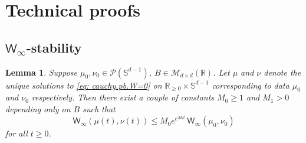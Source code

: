 \documentclass[a4paper,11pt]{article}
\theoremstyle{plain}
\newtheorem{lemma}[theorem]{Lemma}
\newcommand{\R}{\mathbb{R}}
\renewcommand{\S}{\mathbb{S}^{d-1}}
\newcommand{\bB}{\bm{\mathit{B}}}
\renewcommand{\leq}{\leqslant}
\renewcommand{\geq}{\geqslant}
\numberwithin{equation}{section}
\begin{document}
\section{Technical proofs}

\subsection{\texorpdfstring{$\mathsf{W}_\infty$-stability}{$\mathsf{W}_\infty$-stability}}


\begin{lemma}\label{lem: gronwall.transfer.plan}
    Suppose $\mu_0,\nu_0\in \mathscr{P}(\S)$, $\bB\in\mathscr{M}_{d\times d}(\R)$. Let $\mu$ and  $\nu$ denote the unique solutions to \eqref{eq: cauchy.pb.W=0} on $\R_{\geq0}\times\S$ corresponding to data $\mu_0$ and $\nu_0$ respectively. Then there exist a couple of constants $M_0\geq 1$ and $M_1>0$ depending only on $\bB$ such that 
    \begin{equation*}
        \mathsf{W}_\infty(\mu(t),\nu(t))\leq M_0e^{e^{M_1 t} }\,\mathsf{W}_\infty(\mu_0,\nu_0)
    \end{equation*}
    for all $t\geq0$.
\end{lemma}
\end{document}
